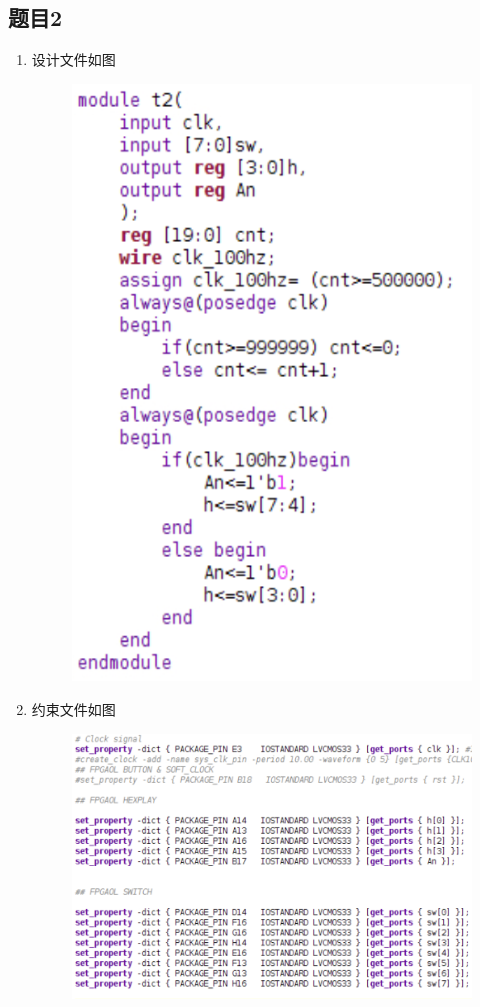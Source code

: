 \documentclass{article}
\begin{document}
    \subsection*{题目2} 
    \begin{enumerate}
        \item []设计文件如图
        \begin{figure}[htbp]
            \centering
            \includegraphics[scale=0.8]{v2.png}
        \end{figure}

        \item []约束文件如图
        \begin{figure}[htbp]
            \centering
            \includegraphics[scale=0.8]{x2.png}
        \end{figure}


\end{enumerate}
\end{document}
